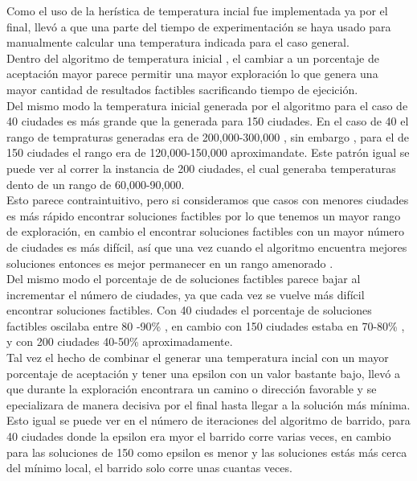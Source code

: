 \documentclass[a4paper]{article}
\begin{document}
Como el uso de la her\'istica de temperatura incial fue implementada ya por el final, llev\'o a que una parte del tiempo de experimentaci\'on se haya usado para manualmente calcular una temperatura indicada para el caso general.  \\

Dentro del algoritmo de temperatura inicial , el cambiar a un porcentaje de aceptaci\'on mayor parece permitir una mayor exploraci\'on lo que genera una mayor cantidad de resultados factibles sacrificando tiempo de ejecici\'on.\\

Del mismo modo la temperatura inicial generada por el algoritmo para el caso de 40 ciudades es m\'as grande que la generada para 150 ciudades. En el caso de 40  el rango de tempraturas generadas era de 200,000-300,000 , sin embargo , para el de 150 ciudades el rango era de 120,000-150,000 aproximandate. Este patr\'on igual se puede ver al correr la instancia de 200 ciudades, el cual generaba temperaturas dento de un rango de 60,000-90,000. \\


Esto parece contraintuitivo, pero si consideramos que  casos con menores ciudades es m\'as r\'apido encontrar soluciones factibles por lo que tenemos un mayor rango de exploraci\'on, en cambio el encontrar soluciones factibles con un mayor n\'umero de ciudades es m\'as dif\'icil, as\'i que una vez cuando el algoritmo encuentra mejores soluciones entonces es mejor permanecer en un rango amenorado .\\

Del mismo modo el porcentaje de de soluciones factibles parece bajar al incrementar el n\'umero de ciudades, ya que cada vez se vuelve m\'as dif\'icil encontrar soluciones factibles. Con 40 ciudades el porcentaje de soluciones factibles oscilaba entre 80 -90\% , en cambio con 150 ciudades estaba en 70-80\% , y con 200 ciudades 40-50\% aproximadamente.\\

Tal vez el hecho de combinar el generar una temperatura incial con un mayor porcentaje de aceptaci\'on y tener una epsilon con un valor bastante bajo, llev\'o a que durante la exploraci\'on encontrara un camino o direcci\'on  favorable y se epecializara de manera decisiva por el final hasta llegar a la soluci\'on m\'as m\'inima. Esto igual se puede ver en el n\'umero de iteraciones del algoritmo de barrido, para 40 ciudades donde la epsilon era myor el barrido corre varias veces, en cambio para las soluciones de 150 como epsilon es menor y las soluciones est\'as m\'as cerca del m\'inimo local, el barrido solo corre unas cuantas veces.
\end{document}
